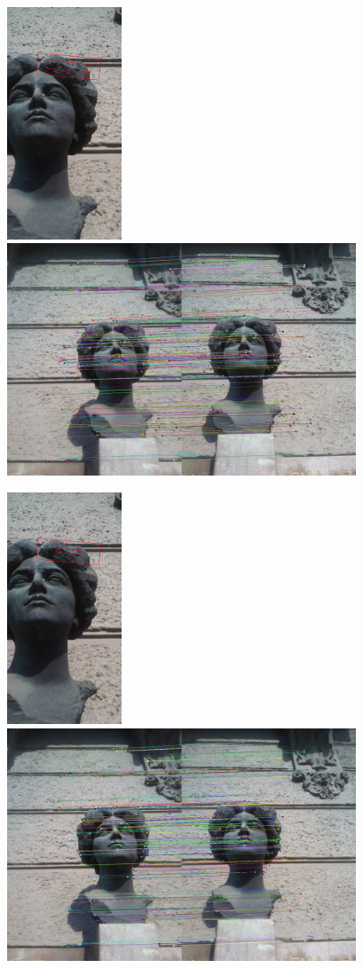 \begin{figure}[H]
\centerline{
\includegraphics[width=3.42cm]{img/rectangle_w_02_h_035_croped.png}
\includegraphics[width=10.4cm]{img/matching_w_02_h_035.png}}
\centerline{
\includegraphics[width=3.42cm]{img/rectangle_w_01__h_02_croped.png}
\includegraphics[width=10.4cm]{img/matching_w_01_h_02.png}}

\end{figure}
